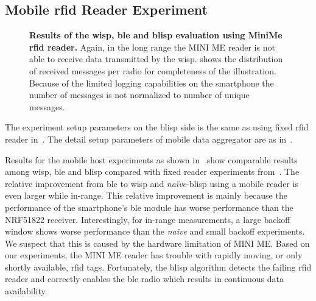 \documentclass[conference,letterpaper,twoside,final,10pt]{IEEEtran}
\begin{document}
\subsection{Mobile \acs{rfid} Reader Experiment}
\label{sec:experiments/minime}

\begin{figure}
	\centering
\caption{\textbf{Results of the \acs{wisp}, \acs{ble} and \acs{blisp} evaluation using MiniMe \acs{rfid} reader.}
	Again, in the long range the MINI ME reader is not able to receive data transmitted by the \acs{wisp}. 
	 shows the distribution of received messages per radio for completeness of the illustration.
	Because of the limited logging capabilities on the smartphone the number of messages is not normalized to number of unique messages.
	}
	\label{fig:minime_results}
\end{figure}

The experiment setup parameters on the \ac{blisp} side is the same as using fixed \ac{rfid} reader in~.
The detail setup parameters of mobile data aggregator are as in~.

Results for the mobile host experiments as shown in~ show comparable results among \ac{wisp}, \ac{ble} and \ac{blisp} compared with fixed reader experiments from~.
The relative improvement from \ac{ble} to \ac{wisp} and \emph{na\"ive}-\ac{blisp} using a mobile reader is even larger while in-range.
This relative improvement is mainly because the performance of the smartphone's \ac{ble} module has worse performance than the NRF51822 receiver.
Interestingly, for in-range measurements, a large backoff window shows worse performance than the \emph{na\"ive} and small backoff experiments.
We suspect that this is caused by the hardware limitation of MINI ME.
Based on our experiments, the MINI ME reader has trouble with rapidly moving, or only shortly available, \ac{rfid} tags.
Fortunately, the \ac{blisp} algorithm detects the failing \ac{rfid} reader and correctly enables the \ac{ble} radio which results in continuous data availability.
\end{document}
